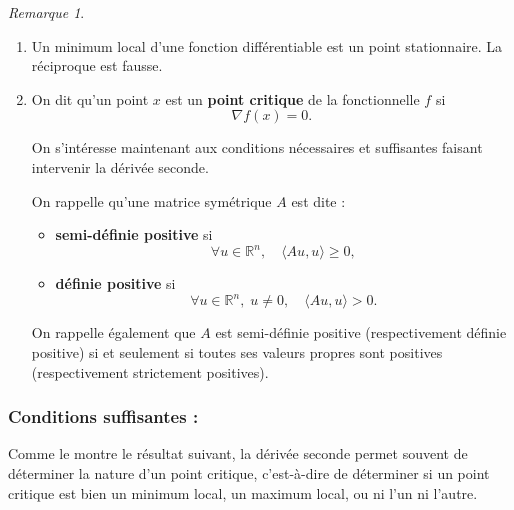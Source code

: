 \documentclass[a4paper,12pt,openany]{book}
\theoremstyle{plain}
\theoremstyle{definition}
\theoremstyle{remark}
\newtheorem{remark}[theorem]{Remarque}
\theoremstyle{nbstyle}
\begin{document}
	\begin{remark} 
		\begin{enumerate}
			\item Un minimum local d'une fonction différentiable est un point stationnaire. La réciproque est fausse.
			\item  On dit qu’un point $x$ est un \textbf{point critique} de la fonctionnelle $f$ si 
			\[
			\nabla f(x) = 0.
			\]
			
			On s’intéresse maintenant aux conditions nécessaires et suffisantes faisant intervenir la dérivée seconde.
			
			\medskip
			
			On rappelle qu’une matrice symétrique $A$ est dite :
			\begin{itemize}
				\item \textbf{semi-définie positive} si 
				\[
				\forall u \in \mathbb{R}^n, \quad \langle Au, u \rangle \geq 0,
				\]
				\item \textbf{définie positive} si 
				\[
				\forall u \in \mathbb{R}^n, \; u \neq 0, \quad \langle Au, u \rangle > 0.
				\]
			\end{itemize}
			
			On rappelle également que $A$ est semi-définie positive (respectivement définie positive) si et seulement si
			toutes ses valeurs propres sont positives (respectivement strictement positives).
			
		\end{enumerate}
	\end{remark}
	
	\subsubsection{Conditions suffisantes :}
	Comme le montre le résultat suivant, la dérivée seconde permet souvent de déterminer la nature d’un point critique, c’est-à-dire de déterminer si un point critique est bien un minimum local, un maximum local, ou ni l’un ni l’autre.
	
\end{document}
